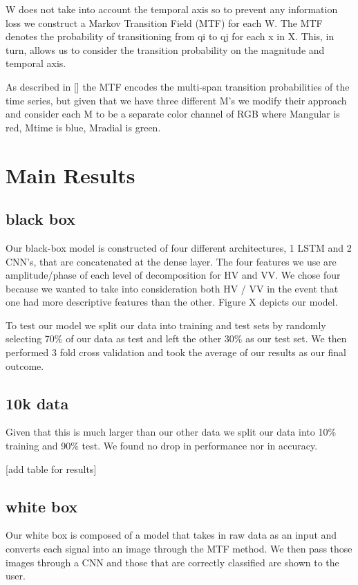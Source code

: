 \documentclass{turabian-thesis}
\begin{document}
W does not take into account the temporal axis so to prevent any information
loss we construct a Markov Transition Field (MTF) for each W. The MTF
denotes the probability of transitioning from qi to qj for each x in X. This,
in turn, allows us to consider the transition probability on the magnitude and
temporal axis.

As described in [] the MTF encodes the multi-span transition probabilities
of the time series, but given that we have three different M’s we modify their
approach and consider each M to be a separate color channel of RGB where
Mangular is red, Mtime is blue, Mradial is green. 

\chapter{Main Results}

\section{black box}
Our black-box model is constructed of four different architectures, 1 LSTM and 2 CNN’s, that are concatenated at the dense layer. The four features we use are amplitude/phase of each level of decomposition for HV and VV. We chose four because we wanted to take into consideration both HV / VV in the event that one had more descriptive features than the other. Figure {X} depicts our model.


To test our model we split our data into training and test sets by randomly selecting 70\% of our data as test and left the other 30\% as our test set. We then performed 3 fold cross validation and took the average of our results as our final outcome.




\section{10k data}
Given that this is much larger than our other data we split our data into 10\% training and 90\% test. We found no drop in performance nor in accuracy. 



[add table for results]

\section{white box}
Our white box is composed of a model that takes in raw data as an input and converts each signal into an image through the MTF method. We then pass those images through a CNN and those that are correctly classified are shown to the user.
\end{document}
